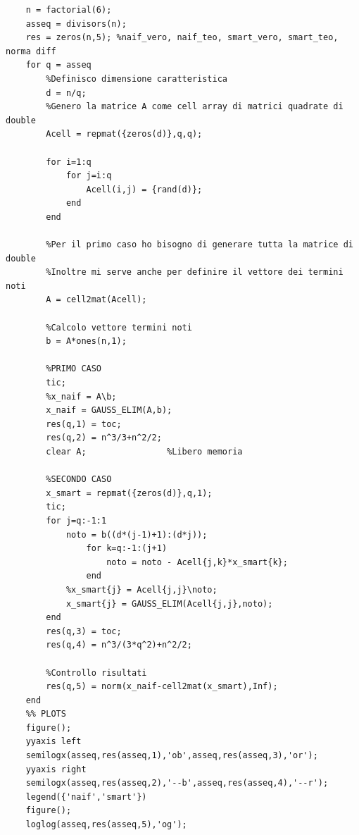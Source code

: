 \documentclass{article}
\begin{document}
\begin{lstlisting}
	n = factorial(6);
	asseq = divisors(n);
	res = zeros(n,5); %naif_vero, naif_teo, smart_vero, smart_teo, norma diff
	for q = asseq
		%Definisco dimensione caratteristica
		d = n/q;
		%Genero la matrice A come cell array di matrici quadrate di double
		Acell = repmat({zeros(d)},q,q);
		
		for i=1:q
			for j=i:q
				Acell(i,j) = {rand(d)};
			end
		end
		
		%Per il primo caso ho bisogno di generare tutta la matrice di double
		%Inoltre mi serve anche per definire il vettore dei termini noti
		A = cell2mat(Acell); 
		
		%Calcolo vettore termini noti
		b = A*ones(n,1);
		
		%PRIMO CASO
		tic;
		%x_naif = A\b;
		x_naif = GAUSS_ELIM(A,b);
		res(q,1) = toc;
		res(q,2) = n^3/3+n^2/2;
		clear A;                %Libero memoria
		
		%SECONDO CASO
		x_smart = repmat({zeros(d)},q,1);
		tic;
		for j=q:-1:1
			noto = b((d*(j-1)+1):(d*j));      
				for k=q:-1:(j+1)
					noto = noto - Acell{j,k}*x_smart{k};
				end
			%x_smart{j} = Acell{j,j}\noto;
			x_smart{j} = GAUSS_ELIM(Acell{j,j},noto);
		end
		res(q,3) = toc;
		res(q,4) = n^3/(3*q^2)+n^2/2;
		
		%Controllo risultati
		res(q,5) = norm(x_naif-cell2mat(x_smart),Inf);
	end
	%% PLOTS
	figure();
	yyaxis left
	semilogx(asseq,res(asseq,1),'ob',asseq,res(asseq,3),'or');
	yyaxis right
	semilogx(asseq,res(asseq,2),'--b',asseq,res(asseq,4),'--r');
	legend({'naif','smart'})
	figure();
	loglog(asseq,res(asseq,5),'og');
\end{lstlisting}



\end{document}
